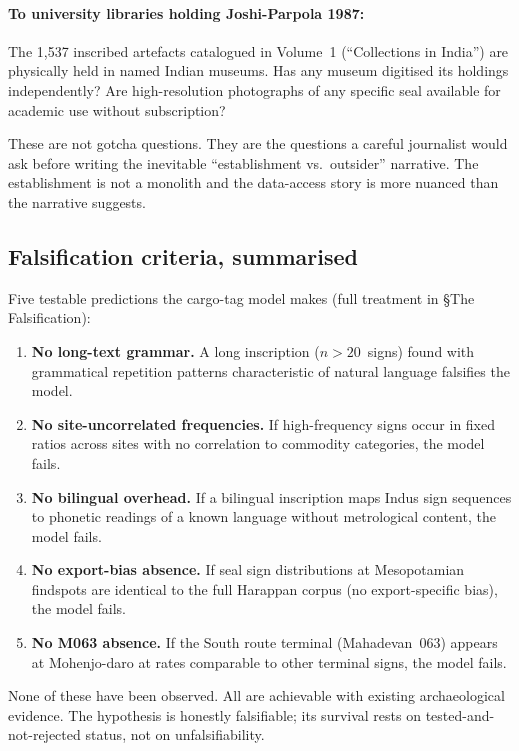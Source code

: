 \paragraph{To university libraries holding Joshi-Parpola 1987:}
The 1{,}537 inscribed artefacts catalogued in Volume~1
(``Collections in India'') are physically held in named Indian
museums. Has any museum digitised its holdings independently?
Are high-resolution photographs of any specific seal available for
academic use without subscription?

These are not gotcha questions. They are the questions a careful
journalist would ask before writing the inevitable
``establishment vs.\ outsider'' narrative. The establishment is
not a monolith and the data-access story is more nuanced than the
narrative suggests.

\subsection{Falsification criteria, summarised}

Five testable predictions the cargo-tag model makes (full
treatment in §The Falsification):

\begin{enumerate}[nosep]
\item \textbf{No long-text grammar.} A long inscription
  ($n > 20$~signs) found with grammatical repetition patterns
  characteristic of natural language falsifies the model.
\item \textbf{No site-uncorrelated frequencies.} If high-frequency
  signs occur in fixed ratios across sites with no correlation to
  commodity categories, the model fails.
\item \textbf{No bilingual overhead.} If a bilingual inscription
  maps Indus sign sequences to phonetic readings of a known
  language without metrological content, the model fails.
\item \textbf{No export-bias absence.} If seal sign distributions
  at Mesopotamian findspots are identical to the full Harappan
  corpus (no export-specific bias), the model fails.
\item \textbf{No M063 absence.} If the South route terminal
  (Mahadevan~063) appears at Mohenjo-daro at rates comparable to
  other terminal signs, the model fails.
\end{enumerate}

None of these have been observed. All are achievable with existing
archaeological evidence. The hypothesis is honestly falsifiable;
its survival rests on tested-and-not-rejected status, not on
unfalsifiability.

